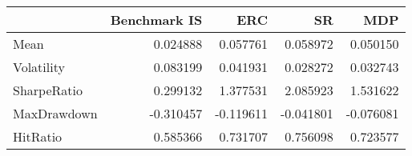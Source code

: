 \begin{tabular}{lrrrr}
\toprule
{} &  Benchmark IS &       ERC &        SR &       MDP \\
\midrule
Mean        &      0.024888 &  0.057761 &  0.058972 &  0.050150 \\
Volatility  &      0.083199 &  0.041931 &  0.028272 &  0.032743 \\
SharpeRatio &      0.299132 &  1.377531 &  2.085923 &  1.531622 \\
MaxDrawdown &     -0.310457 & -0.119611 & -0.041801 & -0.076081 \\
HitRatio    &      0.585366 &  0.731707 &  0.756098 &  0.723577 \\
\bottomrule
\end{tabular}
